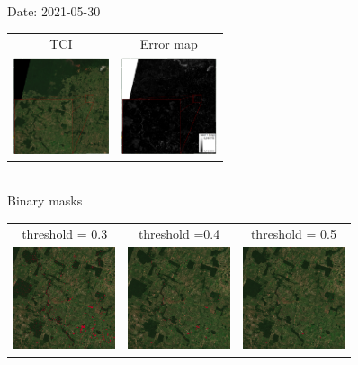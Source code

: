 \documentclass{beamer}
\begin{document}
\begin{frame}{Date: 2021-05-30}
    \centering
        \begin{tabular}{cc}
        TCI & Error map\\
        \includegraphics[width=2.8cm]{Figures/v3/20210530/TCI/tci_zoom2.pdf}
        &
        \includegraphics[width=2.8cm]{Figures/v3/20210530/error_map/error_zoom2.pdf}
    \end{tabular}
    \\
   \centering
    Binary masks
        \begin{tabular}{ccc}
            threshold = 0.3  & threshold =0.4 &  threshold = 0.5 \\
        \includegraphics[width=3cm]{Figures/v3/20210530/umbral_03/zoom2.png}
        &
        \includegraphics[width=3cm]{Figures/v3/20210530/umbral_04/zoom2.png}
        &
        \includegraphics[width=3cm]{Figures/v3/20210530/umbral_05/zoom2.png}
        \end{tabular}
\end{frame}
\end{document}
